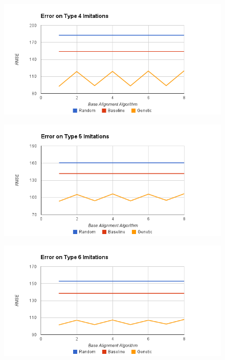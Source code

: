 \begin{figure}[center]
	\centering
	\includegraphics[width=16cm]{images/error_type_4_imitations.png}
	\caption{}
	\label{fig:c4}
\end{figure}
\begin{figure}[center]
	\centering
	\includegraphics[width=16cm]{images/error_type_5_imitations.png}
	\caption{}
	\label{fig:c5}
\end{figure}
\begin{figure}[center]
	\centering
	\includegraphics[width=16cm]{images/error_type_6_imitations.png}
	\caption{}
	\label{fig:c6}
\end{figure}

